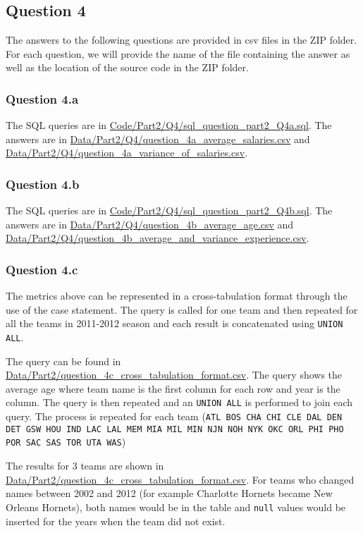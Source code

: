 
\subsection{Question 4}
\label{subsec:414}

The answers to the following questions are provided in csv files in the ZIP folder. For each question, we will provide the name of the file containing the answer as well as the location of the source code in the ZIP folder.

\subsubsection{Question 4.a}
\label{subsubsec:414a}

The SQL queries are in \url{Code/Part2/Q4/sql_question_part2_Q4a.sql}. The answers are in \url{Data/Part2/Q4/question_4a_average_salaries.csv} and \url{Data/Part2/Q4/question_4a_variance_of_salaries.csv}.

\subsubsection{Question 4.b}
\label{subsubsec:414b}

The SQL queries are in \url{Code/Part2/Q4/sql_question_part2_Q4b.sql}. The answers are in \url{Data/Part2/Q4/question_4b_average_age.csv} and \url{Data/Part2/Q4/question_4b_average_and_variance_experience.csv}.

\subsubsection{Question 4.c}
\label{subsubsec:414c}

The metrics above can be represented in a cross-tabulation format through the use of the case statement. The query is called for one team and then repeated for all the teams in 2011-2012 season and each result is concatenated using \verb|UNION ALL|. 

The query can be found in \url{Data/Part2/question_4c_cross_tabulation_format.csv}.
The query shows the average age where team name is the first column for each row and year is the column. The query is then repeated and an \verb|UNION ALL| is performed to join each query. The process is repeated for each team (\verb|ATL BOS CHA CHI CLE DAL DEN DET GSW HOU IND LAC LAL MEM MIA MIL MIN NJN NOH NYK OKC ORL PHI PHO POR SAC SAS TOR UTA WAS|)

The results for 3 teams are shown in \url{Data/Part2/question_4c_cross_tabulation_format.csv}.  For teams who changed names between 2002 and 2012 (for example Charlotte Hornets became New Orleans Hornets), both names would be in the table and \verb|null| values would be inserted for the years when the team did not exist. 
